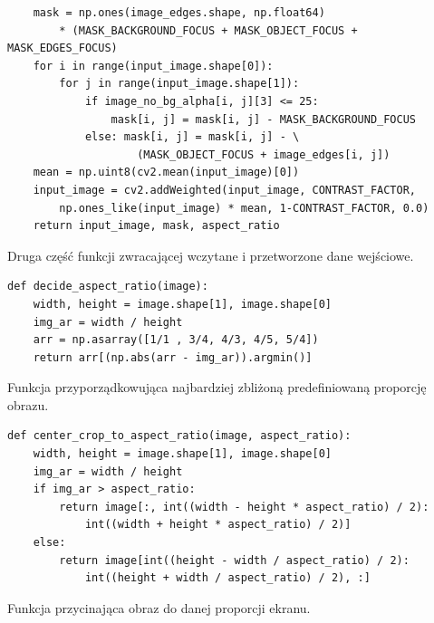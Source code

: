         \begin{code}[H]
        \begin{verbatim}
    mask = np.ones(image_edges.shape, np.float64)
        * (MASK_BACKGROUND_FOCUS + MASK_OBJECT_FOCUS + MASK_EDGES_FOCUS)
    for i in range(input_image.shape[0]):
        for j in range(input_image.shape[1]):
            if image_no_bg_alpha[i, j][3] <= 25:
                mask[i, j] = mask[i, j] - MASK_BACKGROUND_FOCUS
            else: mask[i, j] = mask[i, j] - \
                    (MASK_OBJECT_FOCUS + image_edges[i, j])
    mean = np.uint8(cv2.mean(input_image)[0]) 
    input_image = cv2.addWeighted(input_image, CONTRAST_FACTOR, 
        np.ones_like(input_image) * mean, 1-CONTRAST_FACTOR, 0.0)
    return input_image, mask, aspect_ratio 
        \end{verbatim}
        \caption{Druga część funkcji zwracającej wczytane i przetworzone dane wejściowe.}
        \label{imp-art-input-code-2}
        \end{code}
        
        \begin{code}[H]
        \begin{verbatim}
def decide_aspect_ratio(image):
    width, height = image.shape[1], image.shape[0]
    img_ar = width / height
    arr = np.asarray([1/1 , 3/4, 4/3, 4/5, 5/4])
    return arr[(np.abs(arr - img_ar)).argmin()]
        \end{verbatim}
        \caption{Funkcja przyporządkowująca najbardziej zbliżoną  predefiniowaną proporcję obrazu.}
        \label{imp-art-input-ar-code}
        \end{code}
        
        \begin{code}[H]
        \begin{verbatim}
def center_crop_to_aspect_ratio(image, aspect_ratio):
    width, height = image.shape[1], image.shape[0]
    img_ar = width / height
    if img_ar > aspect_ratio:
        return image[:, int((width - height * aspect_ratio) / 2):
            int((width + height * aspect_ratio) / 2)]
    else:
        return image[int((height - width / aspect_ratio) / 2):
            int((height + width / aspect_ratio) / 2), :]
        \end{verbatim}
        \caption{Funkcja przycinająca obraz do danej proporcji ekranu.}
        \label{imp-art-input-crop-code}
        \end{code}
        
